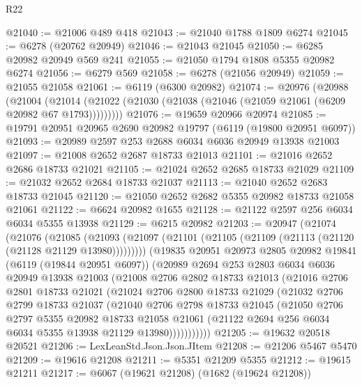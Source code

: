 \begin{lexlean}{R22}
\begin{coremodule}
@21040 := @21006 @489 @418
@21043 := @21040 @1788 @1809 @6274
@21045 := @6278 (@20762 @20949)
@21046 := @21043 @21045
@21050 := @6285 @20982 @20949 @569 @241
@21055 := @21050 @1794 @1808 @5355 @20982 @6274
@21056 := @6279 @569
@21058 := @6278 (@21056 @20949)
@21059 := @21055 @21058
@21061 := @6119 (@6300 @20982)
@21074 := @20976
    (@20988
      (@21004
        (@21014 (@21022 (@21030 (@21038 (@21046 (@21059 @21061 (@6209 @20982 @67 @1793)))))))))
@21076 := @19659 @20966 @20974
@21085 := @19791 @20951 @20965 @2690 @20982 @19797 (@6119 (@19800 @20951 @6097))
@21093 := @20989 @2597 @253 @2688 @6034 @6036 @20949 @13938 @21003
@21097 := @21008 @2652 @2687 @18733 @21013
@21101 := @21016 @2652 @2686 @18733 @21021
@21105 := @21024 @2652 @2685 @18733 @21029
@21109 := @21032 @2652 @2684 @18733 @21037
@21113 := @21040 @2652 @2683 @18733 @21045
@21120 := @21050 @2652 @2682 @5355 @20982 @18733 @21058 @21061
@21122 := @6624 @20982 @1655
@21128 := @21122 @2597 @256 @6034 @6034 @5355 @13938
@21129 := @6215 @20982
@21203 := @20947
    (@21074
      (@21076
        (@21085
          (@21093 (@21097 (@21101 (@21105 (@21109 (@21113 (@21120 (@21128 @21129 @13980)))))))))
        (@19835
          @20951
          @20973
          @2805
          @20982
          @19841
          (@6119 (@19844 @20951 @6097))
          (@20989
            @2694
            @253
            @2803
            @6034
            @6036
            @20949
            @13938
            @21003
            (@21008
              @2706
              @2802
              @18733
              @21013
              (@21016
                @2706
                @2801
                @18733
                @21021
                (@21024
                  @2706
                  @2800
                  @18733
                  @21029
                  (@21032
                    @2706
                    @2799
                    @18733
                    @21037
                    (@21040
                      @2706
                      @2798
                      @18733
                      @21045
                      (@21050
                        @2706
                        @2797
                        @5355
                        @20982
                        @18733
                        @21058
                        @21061
                        (@21122 @2694 @256 @6034 @6034 @5355 @13938 @21129 @13980)))))))))))
@21205 := @19632 @20518 @20521
@21206 := LexLeanStd.Json.Json.JItem
@21208 := @21206 @5467 @5470
@21209 := @19616 @21208
@21211 := @5351 @21209 @5355
@21212 := @19615 @21211
@21217 := @6067 (@19621 @21208) (@1682 (@19624 @21208))

\end{coremodule}
\end{lexlean}
